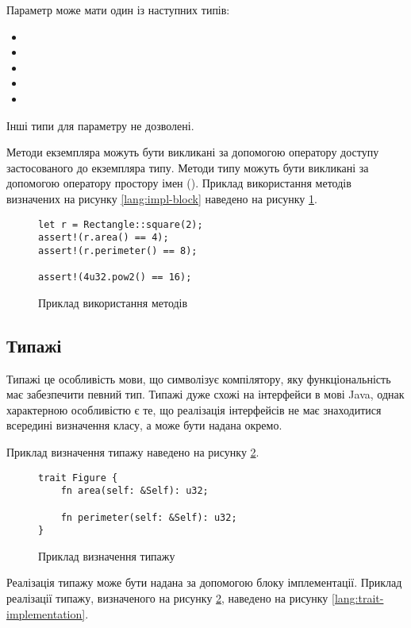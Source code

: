 \documentclass[main.tex]{subfiles}
\begin{document}
Параметр  може мати один із наступних типів:
\begin{itemize}[nosep]
\item {}
\item {}
\item {}
\item {}
\item {}
\end{itemize}
Інші типи для параметру  не дозволені.

Методи екземпляра можуть бути викликані за допомогою оператору доступу застосованого до екземпляра типу. Методи типу можуть бути викликані за допомогою оператору простору імен (\code{::}). Приклад використання методів визначених на рисунку \ref{lang:impl-block} наведено на рисунку \ref{lang:impl-usage}.

\begin{figure}[h]
  \centering
  \begin{verbatim}
let r = Rectangle::square(2);
assert!(r.area() == 4);
assert!(r.perimeter() == 8);

assert!(4u32.pow2() == 16);
  \end{verbatim}
  \caption{Приклад використання методів}
  \label{lang:impl-usage}
\end{figure}

\FloatBarrier
\subsection{Типажі}
Типажі це особливість мови, що символізує компілятору, яку функціональність має забезпечити певний тип.
Типажі дуже схожі на інтерфейси в мові Java, однак характерною особливістю є те, що реалізація інтерфейсів не має знаходитися всередині визначення класу, а може бути надана окремо.

Приклад визначення типажу наведено на рисунку \ref{lang:trait-declaration}.

\begin{figure}[h]
  \centering
  \begin{verbatim}
trait Figure {
    fn area(self: &Self): u32;

    fn perimeter(self: &Self): u32;
}
  \end{verbatim}
  \caption{Приклад визначення типажу}
  \label{lang:trait-declaration}
\end{figure}

Реалізація типажу може бути надана за допомогою блоку імплементації. Приклад реалізації типажу, визначеного на рисунку \ref{lang:trait-declaration}, наведено на рисунку \ref{lang:trait-implementation}.
\end{document}
